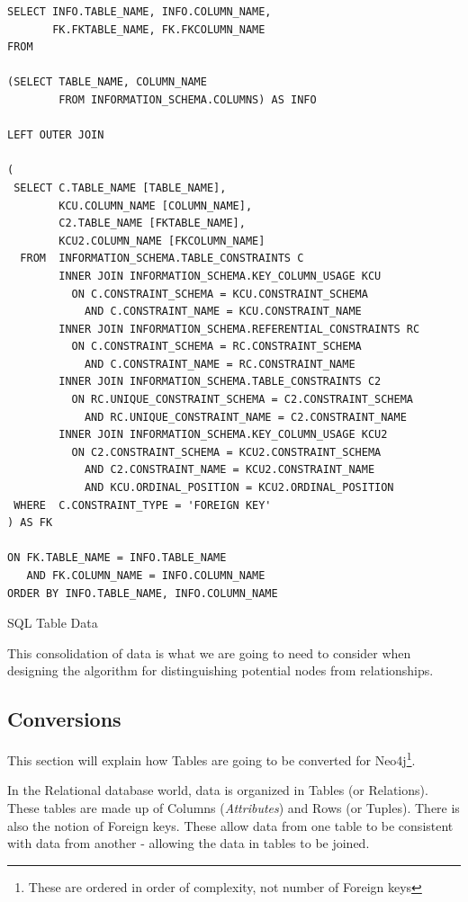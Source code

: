 \documentclass{acm_proc_article-sp}
\begin{document}
\begin{program}
\begin{lstlisting}[frame=single,breaklines=true]
SELECT INFO.TABLE_NAME, INFO.COLUMN_NAME, 
       FK.FKTABLE_NAME, FK.FKCOLUMN_NAME 
FROM

(SELECT TABLE_NAME, COLUMN_NAME
        FROM INFORMATION_SCHEMA.COLUMNS) AS INFO

LEFT OUTER JOIN

(
 SELECT C.TABLE_NAME [TABLE_NAME], 
        KCU.COLUMN_NAME [COLUMN_NAME],
        C2.TABLE_NAME [FKTABLE_NAME], 
        KCU2.COLUMN_NAME [FKCOLUMN_NAME]
  FROM  INFORMATION_SCHEMA.TABLE_CONSTRAINTS C 
        INNER JOIN INFORMATION_SCHEMA.KEY_COLUMN_USAGE KCU 
          ON C.CONSTRAINT_SCHEMA = KCU.CONSTRAINT_SCHEMA 
            AND C.CONSTRAINT_NAME = KCU.CONSTRAINT_NAME 
        INNER JOIN INFORMATION_SCHEMA.REFERENTIAL_CONSTRAINTS RC 
          ON C.CONSTRAINT_SCHEMA = RC.CONSTRAINT_SCHEMA 
            AND C.CONSTRAINT_NAME = RC.CONSTRAINT_NAME 
        INNER JOIN INFORMATION_SCHEMA.TABLE_CONSTRAINTS C2 
          ON RC.UNIQUE_CONSTRAINT_SCHEMA = C2.CONSTRAINT_SCHEMA 
            AND RC.UNIQUE_CONSTRAINT_NAME = C2.CONSTRAINT_NAME 
        INNER JOIN INFORMATION_SCHEMA.KEY_COLUMN_USAGE KCU2 
          ON C2.CONSTRAINT_SCHEMA = KCU2.CONSTRAINT_SCHEMA 
            AND C2.CONSTRAINT_NAME = KCU2.CONSTRAINT_NAME 
            AND KCU.ORDINAL_POSITION = KCU2.ORDINAL_POSITION 
 WHERE  C.CONSTRAINT_TYPE = 'FOREIGN KEY'
) AS FK

ON FK.TABLE_NAME = INFO.TABLE_NAME
   AND FK.COLUMN_NAME = INFO.COLUMN_NAME
ORDER BY INFO.TABLE_NAME, INFO.COLUMN_NAME
\end{lstlisting}
\caption{SQL Table Data}
\end{program}

This consolidation of data is what we are going to need to consider when
designing the algorithm for distinguishing potential nodes from relationships.

\subsection{Conversions}

This section will explain how Tables are going to be converted for 
Neo4j\footnote{These are ordered in order of complexity, not number of
Foreign keys}.

In the Relational database world, data is organized in Tables (or Relations). These tables are made up of Columns (\textit{Attributes}) and Rows (or Tuples). There is also the notion of Foreign keys. These allow data from one table to be consistent with data from another - allowing the data in tables to be joined.
\end{document}
